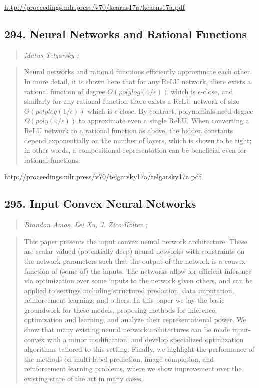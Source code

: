 \documentclass{article}
\begin{document}
\href{http://proceedings.mlr.press/v70/kearns17a/kearns17a.pdf}{http://proceedings.mlr.press/v70/kearns17a/kearns17a.pdf}

\subsection{294. Neural Networks and Rational Functions}

\begin{quote}
\footnotesize{\textit{Matus Telgarsky ;}}
\end{quote}

\begin{quote}
    Neural networks and rational functions efficiently approximate each other. In more detail, it is shown here that for any ReLU network, there exists a rational function of degree $O(polylog(1/\epsilon))$ which is $\epsilon$-close, and similarly for any rational function there exists a ReLU network of size $O(polylog(1/\epsilon))$ which is $\epsilon$-close. By contrast, polynomials need degree $\Omega(poly(1/\epsilon))$ to approximate even a single ReLU. When converting a ReLU network to a rational function as above, the hidden constants depend exponentially on the number of layers, which is shown to be tight; in other words, a compositional representation can be beneficial even for rational functions.  \end{quote}

\href{http://proceedings.mlr.press/v70/telgarsky17a/telgarsky17a.pdf}{http://proceedings.mlr.press/v70/telgarsky17a/telgarsky17a.pdf}

\subsection{295. Input Convex Neural Networks}

\begin{quote}
\footnotesize{\textit{Brandon Amos, Lei Xu, J. Zico Kolter ;}}
\end{quote}

\begin{quote}
    This paper presents the input convex neural network architecture. These are scalar-valued (potentially deep) neural networks with constraints on the network parameters such that the output of the network is a convex function of (some of) the inputs. The networks allow for efficient inference via optimization over some inputs to the network given others, and can be applied to settings including structured prediction, data imputation, reinforcement learning, and others. In this paper we lay the basic groundwork for these models, proposing methods for inference, optimization and learning, and analyze their representational power. We show that many existing neural network architectures can be made input-convex with a minor modification, and develop specialized optimization algorithms tailored to this setting. Finally, we highlight the performance of the methods on multi-label prediction, image completion, and reinforcement learning problems, where we show improvement over the existing state of the art in many cases.  \end{quote}
\end{document}
